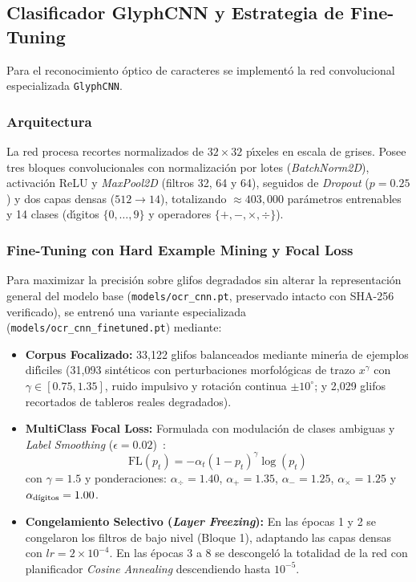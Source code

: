 \subsection{Clasificador GlyphCNN y Estrategia de Fine-Tuning}
Para el reconocimiento \'optico de caracteres se implement\'o la red convolucional especializada \texttt{GlyphCNN}.

\subsubsection{Arquitectura}
La red procesa recortes normalizados de $32 \times 32$ p\'{\i}xeles en escala de grises. Posee tres bloques convolucionales con normalizaci\'on por lotes (\textit{BatchNorm2D}), activaci\'on ReLU y \textit{MaxPool2D} (filtros 32, 64 y 64), seguidos de \textit{Dropout} ($p=0.25$) y dos capas densas ($512 \to 14$), totalizando $\approx 403{,}000$ par\'ametros entrenables y 14 clases (d\'{\i}gitos $\{0, \dots, 9\}$ y operadores $\{+, -, \times, \div\}$).

\subsubsection{Fine-Tuning con Hard Example Mining y Focal Loss}
Para maximizar la precisi\'on sobre glifos degradados sin alterar la representaci\'on general del modelo base (\texttt{models/ocr\_cnn.pt}, preservado intacto con SHA-256 verificado), se entren\'o una variante especializada (\texttt{models/ocr\_cnn\_finetuned.pt}) mediante:
\begin{itemize}
    \item \textbf{Corpus Focalizado:} 33{,}122 glifos balanceados mediante miner\'{\i}a de ejemplos dif\'{\i}ciles (31{,}093 sint\'eticos con perturbaciones morfol\'ogicas de trazo $x^\gamma$ con $\gamma \in [0.75, 1.35]$, ruido impulsivo y rotaci\'on continua $\pm 10^\circ$; y 2{,}029 glifos recortados de tableros reales degradados).
    \item \textbf{MultiClass Focal Loss:} Formulada con modulaci\'on de clases ambiguas y \textit{Label Smoothing} ($\epsilon = 0.02$)~\cite{lin2017focal}:
    \begin{equation}
        \text{FL}(p_t) = -\alpha_t (1 - p_t)^\gamma \log(p_t)
    \end{equation}
    con $\gamma = 1.5$ y ponderaciones: $\alpha_{\div} = 1.40$, $\alpha_{+} = 1.35$, $\alpha_{-} = 1.25$, $\alpha_{\times} = 1.25$ y $\alpha_{\text{d\'{\i}gitos}} = 1.00$.
    \item \textbf{Congelamiento Selectivo (\textit{Layer Freezing}):} En las \'epocas 1 y 2 se congelaron los filtros de bajo nivel (Bloque 1), adaptando las capas densas con $lr = 2 \times 10^{-4}$. En las \'epocas 3 a 8 se descongel\'o la totalidad de la red con planificador \textit{Cosine Annealing} descendiendo hasta $10^{-5}$.
\end{itemize}

